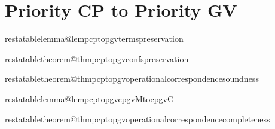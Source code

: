 \documentclass[citecolor=red,linkcolor=blue,runningheads]{llncs}
\makeatletter
\newcommand{\restatetheorem}[1]{%
  \begingroup
  \renewcommand{\thetheorem}{\ref{#1}}%
  \expandafter\expandafter\expandafter\theorem
  \csname restatabletheorem@#1\endcsname
  \endtheorem
  \endgroup
}
\newcommand{\restatelemma}[1]{%
  \begingroup
  \renewcommand{\thelemma}{\ref{#1}}%
  \expandafter\expandafter\expandafter\lemma
  \csname restatablelemma@#1\endcsname
  \endlemma
  \endgroup
}
\makeatother
\begin{document}
\section{Priority CP to Priority GV}
{
  \restatelemma{lempcptopgvtermspreservation}
  

  \restatetheorem{thmpcptopgvconfspreservation}
  

  \restatetheorem{thmpcptopgvoperationalcorrespondencesoundness}
  

  \restatelemma{lempcptopgvcpgvMtocpgvC}
  

  \restatetheorem{thmpcptopgvoperationalcorrespondencecompleteness}
  
}
\end{document}
